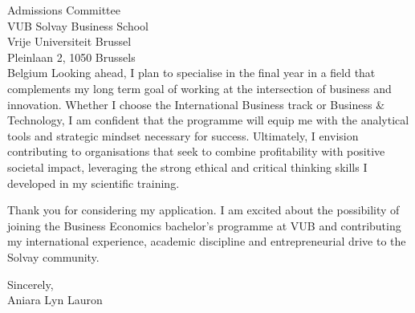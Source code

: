 \documentclass[11pt,a4paper]{letter}
\begin{document}
\begin{letter}{Admissions Committee \\ VUB Solvay Business School \\ Vrije Universiteit Brussel \\ Pleinlaan 2, 1050 Brussels \\ Belgium}
Looking ahead, I plan to specialise in the final year in a field that complements my long term goal of working at the intersection of business and innovation. Whether I choose the International Business track or Business \& Technology, I am confident that the programme will equip me with the analytical tools and strategic mindset necessary for success. Ultimately, I envision contributing to organisations that seek to combine profitability with positive societal impact, leveraging the strong ethical and critical thinking skills I developed in my scientific training.

Thank you for considering my application. I am excited about the possibility of joining the Business Economics bachelor's programme at VUB and contributing my international experience, academic discipline and entrepreneurial drive to the Solvay community.

\closing{Sincerely, \\
Aniara Lyn Lauron}

\end{letter}
\end{document}

